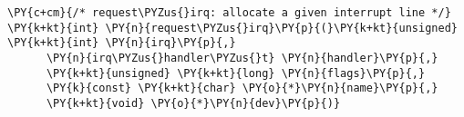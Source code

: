 \begin{Verbatim}[commandchars=\\\{\}]
\PY{c+cm}{/* request\PYZus{}irq: allocate a given interrupt line */}
\PY{k+kt}{int} \PY{n}{request\PYZus{}irq}\PY{p}{(}\PY{k+kt}{unsigned} \PY{k+kt}{int} \PY{n}{irq}\PY{p}{,}
      \PY{n}{irq\PYZus{}handler\PYZus{}t} \PY{n}{handler}\PY{p}{,}
      \PY{k+kt}{unsigned} \PY{k+kt}{long} \PY{n}{flags}\PY{p}{,}
      \PY{k}{const} \PY{k+kt}{char} \PY{o}{*}\PY{n}{name}\PY{p}{,}
      \PY{k+kt}{void} \PY{o}{*}\PY{n}{dev}\PY{p}{)}
\end{Verbatim}
